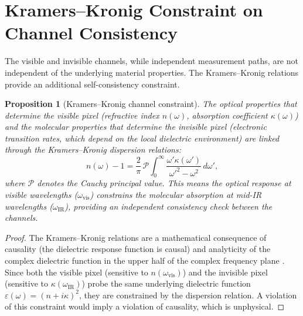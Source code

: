 \documentclass[11pt,twocolumn,a4paper]{article}
\newtheorem{proposition}[theorem]{Proposition}
\begin{document}
\section{Kramers--Kronig Constraint on Channel Consistency}\label{sec:kramerskronig}

The visible and invisible channels, while independent measurement paths, are not independent of the underlying material properties.
The Kramers--Kronig relations \citep{Kramers1927,Kronig1926} provide an additional self-consistency constraint.

\begin{proposition}[Kramers--Kronig channel constraint]\label{prop:kk}
The optical properties that determine the visible pixel (refractive index $n(\omega)$, absorption coefficient $\kappa(\omega)$) and the molecular properties that determine the invisible pixel (electronic transition rates, which depend on the local dielectric environment) are linked through the Kramers--Kronig dispersion relations:
\begin{equation}\label{eq:kk}
n(\omega) - 1 = \frac{2}{\pi}\, \mathcal{P}\!\!\int_0^\infty \frac{\omega' \kappa(\omega')}{\omega'^2 - \omega^2}\, d\omega',
\end{equation}
where $\mathcal{P}$ denotes the Cauchy principal value.
This means the optical response at visible wavelengths ($\omega_{\mathrm{vis}}$) constrains the molecular absorption at mid-IR wavelengths ($\omega_{\mathrm{IR}}$), providing an independent consistency check between the channels.
\end{proposition}
\begin{proof}
The Kramers--Kronig relations are a mathematical consequence of causality (the dielectric response function is causal) and analyticity of the complex dielectric function in the upper half of the complex frequency plane \citep{Jackson1999}.
Since both the visible pixel (sensitive to $n(\omega_{\mathrm{vis}})$) and the invisible pixel (sensitive to $\kappa(\omega_{\mathrm{IR}})$) probe the same underlying dielectric function $\varepsilon(\omega) = (n + i\kappa)^2$, they are constrained by the dispersion relation.
A violation of this constraint would imply a violation of causality, which is unphysical.
\end{proof}


\end{document}
